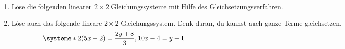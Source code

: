 \documentclass[11pt,oneside]{article}
\begin{document}
	\begin{aufgabe}
		\begin{enumerate}
			\item Löse die folgenden linearen $2\times2$ Gleichungssysteme mit Hilfe des Gleichsetzungsverfahren.
			\item Löse auch das folgende lineare $2\times2$ Gleichungssystem. Denk daran, du kannst auch ganze Terme gleichsetzen.
			\[\systeme*{2(5x-2)=\frac{2y+8}{3},10x-4=y+1}\hspace*{10.5cm}\]
		\end{enumerate}
	\end{aufgabe}
\end{document}
